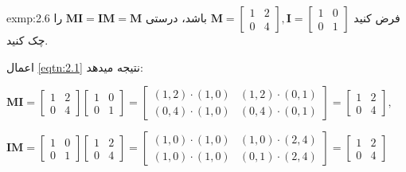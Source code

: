 {\begin{spacing}{1.5}
        \begin{exmp}{exmp:2.6}
            \Large
            فرض کنید
            $\textbf{M}=\begin{bmatrix}
                            1 & 2 \\
                            0 & 4
            \end{bmatrix}, \textbf{I}=\begin{bmatrix}
                                          1 & 0 \\
                                          0 & 1
            \end{bmatrix}$
            باشد، درستی $\textbf{MI}=\textbf{IM}=\textbf{M}$ را چک کنید.

            اعمال \ref{eqtn:2.1} نتیجه میدهد:

            \begin{center}
                $\textbf{MI}=\begin{bmatrix}
                                 1 & 2 \\
                                 0 & 4
                \end{bmatrix}\begin{bmatrix}
                                 1 & 0 \\
                                 0 & 1
                \end{bmatrix}=\begin{bmatrix}
                (1,2)
                                  \cdot(1,0)      & (1,2)\cdot(0,1) \\
                                  (0,4)\cdot(1,0) & (0,4)\cdot(0,1)
                \end{bmatrix}=\begin{bmatrix}
                                  1 & 2 \\
                                  0 & 4
                \end{bmatrix},$
            \end{center}
            \begin{center}
                $\textbf{IM}=\begin{bmatrix}
                                 1 & 0 \\
                                 0 & 1
                \end{bmatrix}\begin{bmatrix}
                                 1 & 2 \\
                                 0 & 4
                \end{bmatrix}=\begin{bmatrix}
                (1,0)
                                  \cdot(1,0)      & (1,0)\cdot(2,4) \\
                                  (1,0)\cdot(1,0) & (0,1)\cdot(2,4)
                \end{bmatrix}=\begin{bmatrix}
                                  1 & 2 \\
                                  0 & 4
                \end{bmatrix}$
            \end{center}


\end{exmp}
\end{spacing}}
